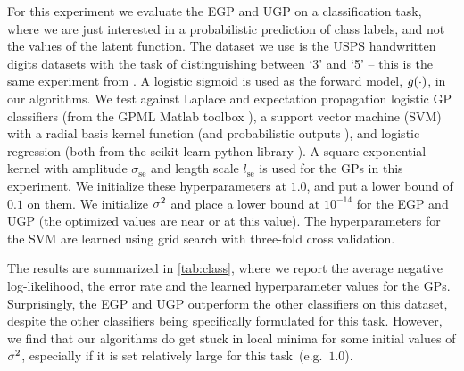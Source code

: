 \documentclass{article} %
\begin{document}
For this experiment we evaluate the EGP and UGP on a %
classification task, where we are just interested in a probabilistic prediction
of class labels, and not the values of the latent function. The dataset we use
is the USPS handwritten digits datasets with the task of distinguishing between
`3' and `5' -- this is the same experiment from \cite{Rasmussen2006}. A
logistic sigmoid is used as the forward model, $g\!\left({{\cdot}}\right)$, in our
algorithms. We test against Laplace and expectation propagation logistic GP
classifiers (from the GPML Matlab toolbox \cite{Rasmussen2006}), a support
vector machine (SVM) with a radial basis kernel function (and probabilistic
outputs \cite{Platt1999}), and logistic regression (both from the scikit-learn
python library \cite{scikit-learn}). A square exponential kernel with amplitude
$\sigma_\text{se}$ and length scale $l_\text{se}$ is used for the GPs in this
experiment. We initialize these hyperparameters at $1.0$, and put a lower bound
of $0.1$ on them. We initialize $\sigma^2$ and place a lower bound at $10^{-14}$
for the EGP and UGP (the optimized values are near or at this value). The
hyperparameters for the SVM are learned using grid search with three-fold cross
validation. 


The results are summarized in \autoref{tab:class}, where we report the average
negative log-likelihood, the error rate and the learned hyperparameter values
for the GPs. Surprisingly, the EGP and UGP outperform the other classifiers on
this dataset, despite the other classifiers being specifically formulated for
this task. However, we find that our algorithms do get stuck in local minima
for some initial values of $\sigma^2$, especially if it is set relatively large
for this task~(e.g.~$1.0$).
\end{document}
